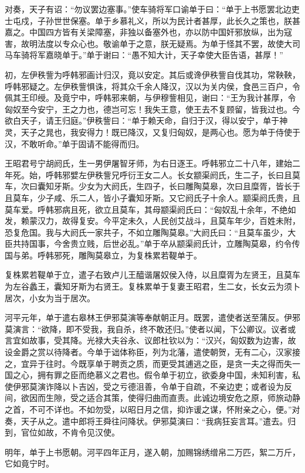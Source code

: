 \documentclass[]{article}
\begin{document}
对奏，天子有诏：``勿议罢边塞事。''使车骑将军口谕单于曰：``单于上书愿罢北边吏士屯戍，子孙世世保塞。单于乡慕礼义，所以为民计者甚厚，此长久之策也，朕甚嘉之。中国四方皆有关梁障塞，非独以备塞外也，亦以防中国奸邪放纵，出为寇害，故明法度以专众心也。敬谕单于之意，朕无疑焉。为单于怪其不罢，故使大司马车骑将军嘉晓单于。''单于谢曰：``愚不知大计，天子幸使大臣告语，甚厚！''

初，左伊秩訾为呼韩邪画计归汉，竟以安定。其后或谗伊秩訾自伐其功，常鞅鞅，呼韩邪疑之。左伊秩訾惧诛，将其众千余人降汉，汉以为关内侯，食邑三百户，令佩其王印绶。及竟宁中，呼韩邪来朝，与伊穆訾相见，谢曰：``王为我计甚厚，令匈奴至今安宁，王之力也，德岂可忘！我失王意，使王去不复顾留，皆我过也。今欲白天子，请王归庭。''伊秩訾曰：``单于赖天命，自归于汉，得以安宁，单于神灵，天子之晁也，我安得力！既已降汉，又复归匈奴，是两心也。愿为单于侍使于汉，不敢听命。''单于固请不能得而归。

王昭君号宁胡阏氏，生一男伊屠智牙师，为右日逐王。呼韩邪立二十八年，建始二年死。始，呼韩邪嬖左伊秩訾兄呼衍王女二人。长女颛渠阏氏，生二子，长曰且莫车，次曰囊知牙斯。少女为大阏氏，生四子，长曰雕陶莫皋，次曰且糜胥，皆长于且莫车，少子咸、乐二人，皆小子囊知牙斯。又它阏氏子十余人。颛渠阏氏贵，且莫车爱。呼韩邪病且死，欲立且莫车，其母颛渠阏氏曰：``匈奴乱十余年，不绝如发，赖蒙汉力，故得复安。今平定未久，人民创艾战斗，且莫车年少，百姓未附，恐复危国。我与大阏氏一家共子，不如立雕陶莫皋。''大阏氏曰：``且莫车虽少，大臣共持国事，今舍贵立贱，后世必乱。''单于卒从颛渠阏氏计，立雕陶莫皋，约令传国与弟。呼韩邪死，雕陶莫皋立，为复株累若鞮单于。

复株累若鞮单于立，遣子右致卢儿王醯谐屠奴侯入侍，以且糜胥为左贤王，且莫车为左谷蠡王，囊知牙斯为右贤王。复株累单于复妻王昭君，生二女，长女云为须卜居次，小女为当于居次。

河平元年，单于遣右皋林王伊邪莫演等奉献朝正月。既罢，遣使者送至蒲反。伊邪莫演言：``欲降，即不受我，我自杀，终不敢还归。''使者以闻，下公卿议。议者或言宜如故事，受其降。光禄大夫谷永、议郎杜钦以为：``汉兴，匈奴数为边害，故设金爵之赏以待降者。今单于诎体称臣，列为北藩，遣使朝贺，无有二心，汉家接之，宜异于往时。今既享单于聘贡之质，而更受其逋逃之臣，是贪一夫之得而失一国之心，拥有罪之臣而绝慕义之君也。假令单于初立，欲委身中国，未知利害，私使伊邪莫演诈降以卜吉凶，受之亏德沮善，令单于自疏，不亲边吏；或者设为反间，欲因而生隙，受之适合其策，使得归曲而直责。此诚边境安危之原，师旅动静之首，不可不详也。不如勿受，以昭日月之信，抑诈谖之谋，怀附亲之心，便。''对奏，天子从之。遣中郎将王舜往问降状。伊邪莫演曰：``我病狂妄言耳。''遣去。归到，官位如故，不肯令见汉使。

明年，单于上书愿朝。河平四年正月，遂入朝，加赐锦绣缯帛二万匹，絮二万斤，它如竟宁时。
\end{document}
